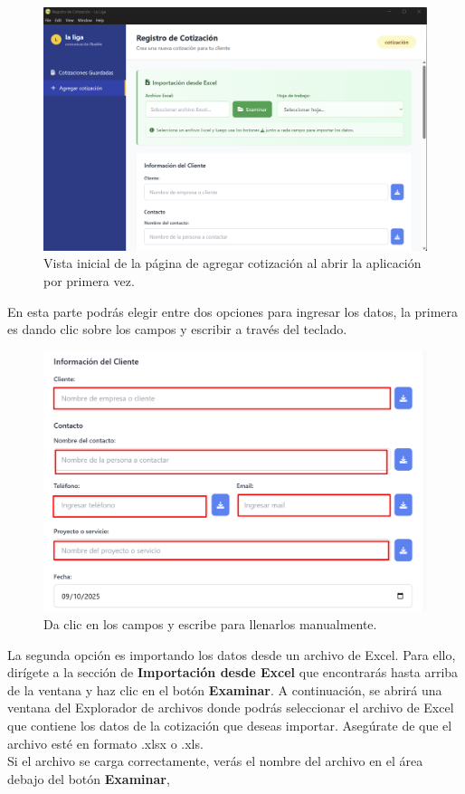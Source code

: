 \documentclass{Pretexto/bluereport}
\begin{document}
\begin{minipage}
\begin{figure}[H] 
    \centering
        \includegraphics[width=0.8\linewidth]{img/add_cotizacion_inicial.png}
\caption{Vista inicial de la página de agregar cotización al abrir la aplicación por primera vez.}\label{fig:vista_inicial_add}
\end{figure}
En esta parte podrás elegir entre dos opciones para ingresar los datos, la primera es dando clic sobre los campos y escribir a través del teclado.
\begin{figure}[H] 
    \centering
        \includegraphics[width=0.7\linewidth]{img/llenar_campos.png}
    \caption{Da clic en los campos y escribe para llenarlos manualmente.}
    \label{fig:llenado_manual1}
\end{figure}
La segunda opción es importando los datos desde un archivo de Excel. Para ello, dirígete a la sección de 
\textbf{Importación desde Excel} que encontrarás hasta arriba de la ventana y haz clic en el botón \textbf{Examinar}. A continuación, se abrirá una ventana 
del Explorador de archivos donde podrás seleccionar el archivo de Excel que contiene los datos de la cotización que deseas importar. Asegúrate de que el archivo 
esté en formato .xlsx o .xls.\\
Si el archivo se carga correctamente, verás el nombre del archivo en el área debajo del botón \textbf{Examinar}, 

\end{minipage}
\end{document}
